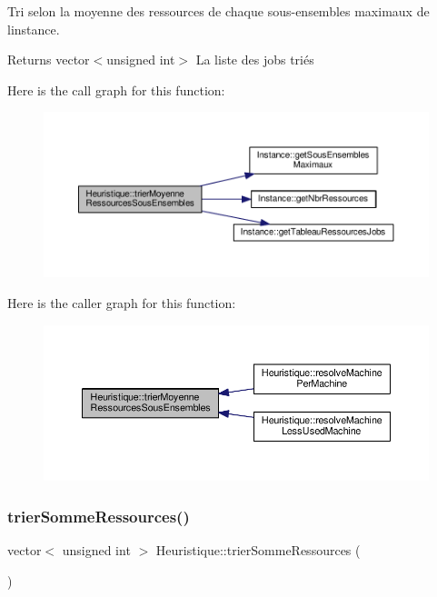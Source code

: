 Tri selon la moyenne des ressources de chaque sous-\/ensembles maximaux de l\textquotesingle{}instance. 

\begin{DoxyReturn}{Returns}
vector$<$unsigned int$>$ La liste des jobs triés 
\end{DoxyReturn}
Here is the call graph for this function\+:\nopagebreak
\begin{figure}[H]
\begin{center}
\leavevmode
\includegraphics[width=350pt]{classHeuristique_a4541884c49c13e08ee6c73c919388fd3_cgraph}
\end{center}
\end{figure}
Here is the caller graph for this function\+:\nopagebreak
\begin{figure}[H]
\begin{center}
\leavevmode
\includegraphics[width=350pt]{classHeuristique_a4541884c49c13e08ee6c73c919388fd3_icgraph}
\end{center}
\end{figure}
\mbox{\label{classHeuristique_a6101d6d238a7667b820b50629e4d497f}} 
\subsubsection{\texorpdfstring{trier\+Somme\+Ressources()}{trierSommeRessources()}}
{\footnotesize\ttfamily vector$<$ unsigned int $>$ Heuristique\+::trier\+Somme\+Ressources (\begin{DoxyParamCaption}{ }\end{DoxyParamCaption})}




